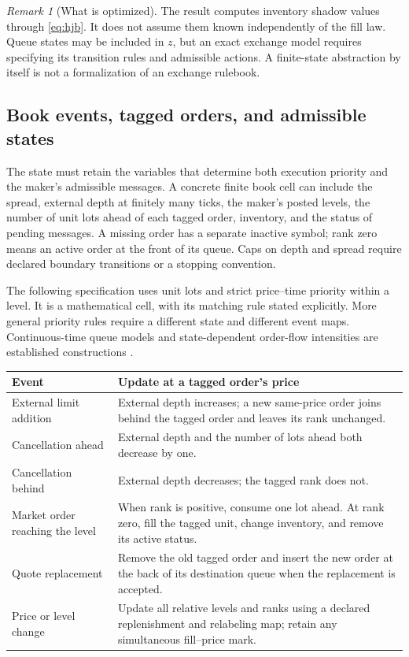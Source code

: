 \documentclass[11pt]{article}
\theoremstyle{plain}
\theoremstyle{definition}
\theoremstyle{remark}
\newtheorem{remark}[theorem]{Remark}
\begin{document}
\begin{remark}[What is optimized]
The result computes inventory shadow values through \eqref{eq:hjb}.
It does not assume them known independently of the fill law. Queue
states may be included in \(z\), but an exact exchange model requires
specifying its transition rules and admissible actions. A finite-state
abstraction by itself is not a formalization of an exchange rulebook.
\end{remark}

\subsection{Book events, tagged orders, and admissible states}
\label{sec:bookevents}

The state must retain the variables that determine both execution
priority and the maker's admissible messages. A concrete finite book
cell can include the spread, external depth at finitely many ticks,
the maker's posted levels, the number of unit lots ahead of each
tagged order, inventory, and the status of pending messages. A missing
order has a separate inactive symbol; rank zero means an active order
at the front of its queue. Caps on depth and spread require declared
boundary transitions or a stopping convention.

The following specification uses unit lots and strict price--time
priority within a level. It is a mathematical cell, with its matching
rule stated explicitly. More general priority rules require a different
state and different event maps. Continuous-time queue models and
state-dependent order-flow intensities are established constructions
\citep{ContStoikovTalreja2010,HuangLehalleRosenbaum2015}.

\begin{center}
\begin{tabular}{@{}>{\raggedright\arraybackslash}p{}
                   >{\raggedright\arraybackslash}p{}@{}}
\toprule
Event&Update at a tagged order's price\\
\midrule
External limit addition&External depth increases; a new same-price order
joins behind the tagged order and leaves its rank unchanged.\\
Cancellation ahead&External depth and the number of lots ahead both
decrease by one.\\
Cancellation behind&External depth decreases; the tagged rank does not.\\
Market order reaching the level&When rank is positive, consume one lot ahead.
At rank zero, fill the tagged unit, change inventory, and remove its
active status.\\
Quote replacement&Remove the old tagged order and insert the new order
at the back of its destination queue when the replacement is accepted.\\
Price or level change&Update all relative levels and ranks using a
declared replenishment and relabeling map; retain any simultaneous
fill--price mark.\\
\bottomrule
\end{tabular}
\end{center}
\end{document}
